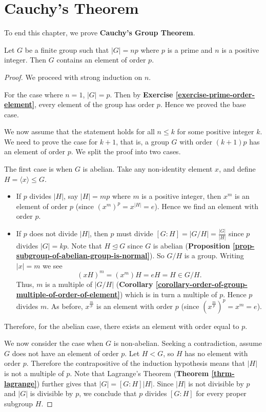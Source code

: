 \section{Cauchy's Theorem}
To end this chapter, we prove \textbf{Cauchy's Group Theorem}.
\begin{theorem}[Cauchy]\label{thrm-cauchy}
    Let $G$ be a finite group such that $|G| = np$ where $p$ is a prime and $n$ is a positive integer. Then $G$ contains an element of order $p$.
\end{theorem}
\begin{proof}
    We proceed with strong induction on $n$.

    For the case where $n = 1$, $|G| = p$. Then by \textbf{Exercise \ref{exercise-prime-order-element}}, every element of the group has order $p$. Hence we proved the base case.

    We now assume that the statement holds for all $n \leq k$ for some positive integer $k$. We need to prove the case for $k+1$, that is, a group $G$ with order $(k+1)p$ has an element of order $p$. We split the proof into two cases.

    The first case is when $G$ is abelian. Take any non-identity element $x$, and define $H = \langle x \rangle \leq G$.
    \begin{itemize}
        \item If $p$ divides $|H|$, say $|H| = mp$ where $m$ is a positive integer, then $x^m$ is an element of order $p$ (since $\left(x^m\right)^p = x^{|H|} = e$). Hence we find an element with order $p$.
        \item If $p$ does not divide $|H|$, then $p$ must divide $[G:H] = |G/H| = \frac{|G|}{|H|}$ since $p$ divides $|G| = kp$. Note that $H \unlhd G$ since $G$ is abelian (\textbf{Proposition \ref{prop-subgroup-of-abelian-group-is-normal}}). So $G/H$ is a group. Writing $|x| = m$ we see
        \[
            (xH)^m = (x^m)H = eH = H \in G/H.
        \]
        Thus, $m$ is a multiple of $|G/H|$ (\textbf{Corollary \ref{corollary-order-of-group-multiple-of-order-of-element}}) which is in turn a multiple of $p$. Hence $p$ divides $m$. As before, $x^{\frac mp}$ is an element with order $p$ (since $\left(x^{\frac mp}\right)^p = x^m = e$).
    \end{itemize}
    Therefore, for the abelian case, there exists an element with order equal to $p$.

    We now consider the case when $G$ is non-abelian. Seeking a contradiction, assume $G$ does not have an element of order $p$. Let $H < G$, so $H$ has no element with order $p$. Therefore the contrapositive of the induction hypothesis means that $|H|$ is not a multiple of $p$. Note that Lagrange's Theorem (\textbf{Theorem \ref{thrm-lagrange}}) further gives that $|G| = [G:H]|H|$. Since $|H|$ is not divisible by $p$ and $|G|$ is divisible by $p$, we conclude that $p$ divides $[G:H]$ for every proper subgroup $H$.


\end{proof}
